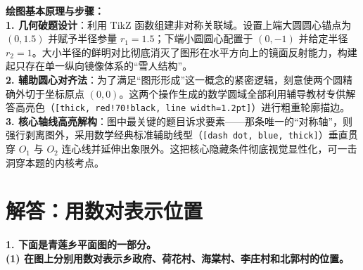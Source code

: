 {\small\color{blue!70!black}
\textbf{绘图基本原理与步骤：}\\
\textbf{1. 几何破题设计}：利用 TikZ 函数组建非对称关联域。设置上端大圆圆心锚点为 $(0, 1.5)$ 并赋予半径参量 $r_1=1.5$；下端小圆圆心配置于 $(0, -1)$ 并给定半径 $r_2=1$。大小半径的鲜明对比彻底消灭了图形在水平方向上的镜面反射能力，构建起只存在单一纵向镜像体系的“雪人结构”。\\
\textbf{2. 辅助圆心对齐法}：为了满足“图形形成”这一概念的紧密逻辑，刻意使两个圆精确外切于坐标原点 $(0,0)$。这两个操作生成的数学圆域全部利用辅导教材专供解答高亮色（\texttt{[thick, red!70!black, line width=1.2pt]}）进行粗重轮廓描边。\\
\textbf{3. 核心轴线高亮解构}：图中最关键的题目诉求要素——那条唯一的“对称轴”，则强行剥离图外，采用数学经典标准辅助线型（\texttt{[dash dot, blue, thick]}）垂直贯穿 $O_1$ 与 $O_2$ 连心线并延伸出象限外。这把核心隐藏条件彻底视觉显性化，可一击洞穿本题的内核考点。
}

\vspace{0.8cm}
\vspace{0.8cm}



\section{解答：用数对表示位置}

\vspace{0.4cm}

\noindent\textbf{1. 下面是青莲乡平面图的一部分。}\\
\textbf{(1) 在图上分别用数对表示乡政府、荷花村、海棠村、李庄村和北郭村的位置。}

\vspace{1.2cm}

